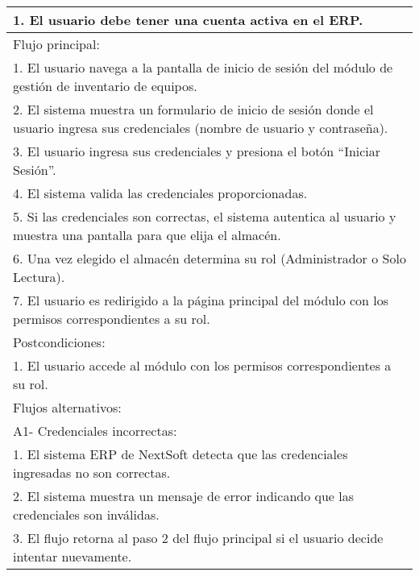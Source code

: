 \documentclass[stu, 12pt, letterpaper, donotrepeattitle, floatsintext, natbib]{apa7}
\begin{document}
\begin{longtable}{@{} p{16.5cm} @{}}
    1. El usuario debe tener una cuenta activa en el ERP.                                                                                 \\ \midrule
    Flujo principal:                                                                                                                      \\
    1. El usuario navega a la pantalla de inicio de sesi\'on del m\'odulo de gesti\'on de inventario de equipos.                          \\
    2. El sistema muestra un formulario de inicio de sesi\'on donde el usuario ingresa sus credenciales (nombre de usuario y contraseña). \\
    3. El usuario ingresa sus credenciales y presiona el bot\'on ``Iniciar Sesi\'on''.                                                    \\
    4. El sistema valida las credenciales proporcionadas.                                                                                 \\
    5. Si las credenciales son correctas, el sistema autentica al usuario y muestra una pantalla para que elija el almac\'en.             \\
    6. Una vez elegido el almac\'en determina su rol (Administrador o Solo Lectura).                                                      \\
    7. El usuario es redirigido a la p\'agina principal del m\'odulo con los permisos correspondientes a su rol.                          \\ \midrule
    Postcondiciones:                                                                                                                      \\
    1. El usuario accede al m\'odulo con los permisos correspondientes a su rol.                                                          \\ \midrule
    Flujos alternativos:                                                                                                                  \\
    A1- Credenciales incorrectas:                                                                                                         \\
    \hspace{1cm}1. El sistema ERP de NextSoft detecta que las credenciales ingresadas no son correctas.                                   \\
    \hspace{1cm}2. El sistema muestra un mensaje de error indicando que las credenciales son inv\'alidas.                                 \\
    \hspace{1cm}3. El flujo retorna al paso 2 del flujo principal si el usuario decide intentar nuevamente.                               \\ \bottomrule
\end{longtable}
\end{document}
